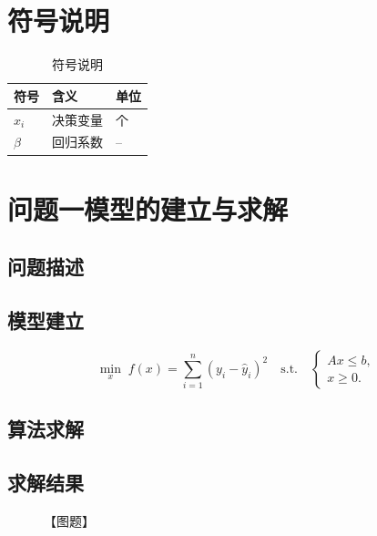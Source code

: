 \documentclass[12pt,a4paper]{ctexart}
\begin{document}
\section{符号说明}
\begin{table}[htbp]
    \centering
    \begin{tabular}{lll}
        \toprule
        符号 & 含义 & 单位 \\
        \midrule
        $x_{i}$ & 决策变量 & 个 \\
        $\beta$ & 回归系数 & -- \\
        \bottomrule
    \end{tabular}
    \caption{符号说明}%
\end{table}

\section{问题一模型的建立与求解}
\subsection{问题描述}
\subsection{模型建立}
\begin{equation}
    \min_{x} \; f(x) = \sum_{i=1}^{n} \left( y_i - \hat{y}_i \right)^2
    \quad \text{s.t.} \quad
    \begin{cases}
        A x \le b, \\
        x \ge 0 .
    \end{cases}
\end{equation}

\subsection{算法求解}
\subsection{求解结果}
\begin{figure}[htbp]
    \centering
    \caption{【图题】}
    \label{fig:m1-01}
\end{figure}
\end{document}
